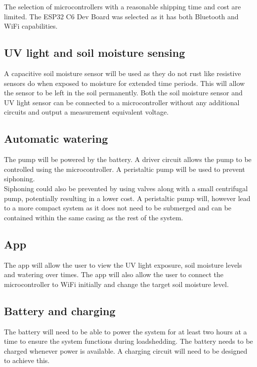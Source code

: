 The selection of microcontrollers with a reasonable shipping time and cost are limited. The ESP32 C6 Dev Board was selected as it has both Bluetooth and WiFi capabilities.


\subsection{UV light and soil moisture sensing}
A capacitive soil moisture sensor will be used as they do not rust like resistive sensors do when exposed to moisture for extended time periods. This will allow the sensor to be left in the soil permanently. Both the soil moisture sensor and UV light sensor can be connected to a microcontroller without any additional circuits and output a measurement equivalent voltage. 

\subsection{Automatic watering}
The pump will be powered by the battery. A driver circuit allows the pump to be controlled using the microcontroller. A peristaltic pump will be used to prevent siphoning. \\

Siphoning could also be prevented by using valves along with a small centrifugal pump, potentially resulting in a lower cost. A peristaltic pump will, however lead to a more compact system as it does not need to be submerged and can be contained within the same casing as the rest of the system.

\subsection{App}
The app will allow the user to view the UV light exposure, soil moisture levels and watering over times. The app will also allow the user to connect the microcontroller to WiFi initially and change the target soil moisture level. 

\subsection{Battery and charging}
The battery will need to be able to power the system for at least two hours at a time to ensure the system functions during loadshedding. The battery needs to be charged whenever power is available. A charging circuit will need to be designed to achieve this.
\\

